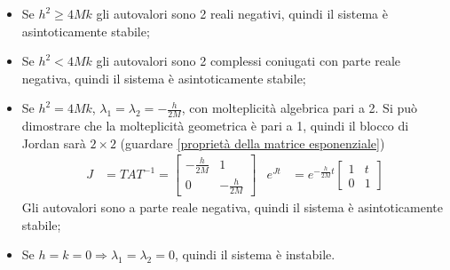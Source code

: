\documentclass{article}
\begin{document}
\begin{itemize}
    \item Se $h^2 \geq 4Mk$ gli autovalori sono 2 reali negativi, quindi il sistema è asintoticamente stabile;
    \item Se $h^2 < 4Mk$ gli autovalori sono 2 complessi coniugati con parte reale negativa, quindi il sistema è asintoticamente stabile;
    \item Se $h^2 = 4Mk$, $\lambda_1 = \lambda_2 = -\frac{h}{2M}$, con molteplicità algebrica pari a 2. Si può dimostrare che la molteplicità geometrica è pari a 1, quindi il blocco di Jordan sarà $2 \times 2$ (guardare \ref{proprietà della matrice esponenziale})
    \begin{align*}
        J &= TAT^{-1} = 
        \begin{bmatrix}
            - \frac{h}{2M} & 1\\
            0 & - \frac{h}{2M}
        \end{bmatrix}
        &
        e^{Jt} &= e^{- \frac{h}{2M}t}
        \begin{bmatrix}
            1 & t\\
            0 & 1
        \end{bmatrix}
    \end{align*}
    Gli autovalori sono a parte reale negativa, quindi il sistema è asintoticamente stabile;
    \item Se $h=k=0 \Longrightarrow \lambda_1=\lambda_2=0$, quindi il sistema è instabile.
\end{itemize}
\end{document}
